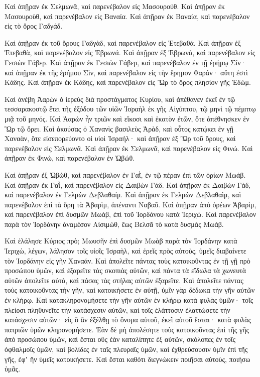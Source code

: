{Καὶ ἀπῇραν ἐκ Σελμωνᾶ, καὶ παρενέβαλον εἰς Μασουρούθ.
Καὶ ἀπῇραν ἐκ Μασουροὺθ, καὶ παρενέβαλον εἰς Βαναία.
Καὶ ἀπῇραν ἐκ Βαναία, καὶ παρενέβαλον εἰς τὸ ὄρος Γαδγάδ.
\par }{\PP {}Καὶ ἀπῇραν ἐκ τοῦ ὄρους Γαδγὰδ, καὶ παρενέβαλον εἰς Ἐτεβαθά.
Καὶ ἀπῇραν ἐξ Ἐτεβαθὰ, καὶ παρενέβαλον εἰς Ἐβρωνά.
Καὶ ἀπῇραν ἐξ Ἐβρωνὰ, καὶ παρενέβαλον εἰς Γεσιὼν Γάβερ.
Καὶ ἀπῇραν ἐκ Γεσιὼν Γάβερ, καὶ παρενέβαλον ἐν τῇ ἐρήμῳ Σίν· καὶ ἀπῇραν ἐκ τῆς ἐρήμου Σὶν, καὶ παρενέβαλον εἰς τὴν ἔρημον Φαράν· αὕτη ἐστὶ Κάδης.
Καὶ ἀπῇραν ἐκ Κάδης, καὶ παρενέβαλον εἰς Ὢρ τὸ ὄρος πλησίον γῆς Ἐδώμ.
\par }{\PP {}Καὶ ἀνέβη Ἀαρὼν ὁ ἱερεὺς διὰ προστάγματος Κυρίου, καὶ ἀπέθανεν ἐκεῖ ἐν τῷ τεσσαρακοστῷ ἔτει τῆς ἐξόδου τῶν υἱῶν Ἰσραὴλ ἐκ γῆς Αἰγύπτου, τῷ μηνὶ τῷ πέμπτῳ μιᾷ τοῦ μηνός.
Καὶ Ἀαρὼν ἦν τριῶν καὶ εἴκοσι καὶ ἑκατὸν ἐτῶν, ὅτε ἀπέθνησκεν ἐν Ὢρ τῷ ὄρει.
Καὶ ἀκούσας ὁ Χανανὶς βασιλεὺς Ἀρὰδ, καὶ οὗτος κατῴκει ἐν γῇ Χαναὰν, ὅτε εἰσεπορεύοντο οἱ υἱοὶ Ἰσραήλ·
καὶ ἀπῇραν ἐξ Ὢρ τοῦ ὄρους, καὶ παρενέβαλον εἰς Σελμωνᾶ.
Καὶ ἀπῇραν ἐκ Σελμωνᾶ, καὶ παρενέβαλον εἰς Φινώ.
Καὶ ἀπῇραν ἐκ Φινὼ, καὶ παρενέβαλον ἐν Ὠβώθ.
\par }{\PP {}Καὶ ἀπῇραν ἐξ Ὠβὼθ, καὶ παρενέβαλον ἐν Γαῒ, ἐν τῷ πέραν ἐπὶ τῶν ὁρίων Μωάβ.
Καὶ ἀπῇραν ἐκ Γαῒ, καὶ παρενέβαλον εἰς Δαιβὼν Γάδ.
Καὶ ἀπῇραν ἐκ Δαιβὼν Γὰδ, καὶ παρενέβαλον ἐν Γελμὼν Δεβλαθαίμ.
Καὶ ἀπῇραν ἐκ Γελμὼν Δεβλαθαὶμ, καὶ παρενέβαλον ἐπὶ τὰ ὄρη τὰ Ἀβαρὶμ, ἀπέναντι Ναβαῦ.
Καὶ ἀπῇραν ἀπὸ ὀρέων Ἀβαρὶμ, καὶ παρενέβαλον ἐπὶ δυσμῶν Μωὰβ, ἐπὶ τοῦ Ἰορδάνου κατὰ Ἱεριχώ.
Καὶ παρενέβαλον παρὰ τὸν Ἰορδάνην ἀναμέσον Αἰσιμώθ, ἕως Βελσᾶ τὸ κατὰ δυσμὰς Μωάβ.
\par }{\PP {}Καὶ ἐλάλησε Κύριος πρὸ; Μωυσῆν ἐπὶ δυσμῶν Μωὰβ παρὰ τὸν Ἰορδάνην κατὰ Ἱεριχὼ, λέγων,
λάλησον τοῖς υἱοῖς Ἰσραὴλ, καὶ ἐρεῖς πρὸς αὐτοὺς, ὑμεῖς διαβαίνετε τὸν Ἰορδάνην εἰς γῆν Χαναάν.
Καὶ ἀπολεῖτε πάντας τοὺς κατοικοῦντας ἐν τῇ γῇ πρὸ προσώπου ὑμῶν, καὶ ἐξαρεῖτε τὰς σκοπιὰς αὐτῶν, καὶ πάντα τὰ εἴδωλα τὰ χωνευτὰ αὐτῶν ἀπολεῖτε αὐτὰ, καὶ πάσας τὰς στήλας αὐτῶν ἐξαρεῖτε.
Καὶ ἀπολεῖτε πάντας τοὺς κατοικοῦντας τὴν γῆν, καὶ κατοικήσετε ἐν αὐτῇ, ὑμῖν γὰρ δέδωκα τὴν γῆν αὐτῶν ἐν κλήρῳ.
Καὶ κατακληρονομήσετε τὴν γῆν αὐτῶν ἐν κλήρῳ κατὰ φυλὰς ὑμῶν· τοῖς πλείοσι πληθυνεῖτε τὴν κατάσχεσιν αὐτῶν, καὶ τοῖς ἐλάττοσιν ἐλαττώσετε τὴν κατάσχεσιν αὐτῶν· εἰς ὃ ἂν ἐξέλθῃ τὸ ὄνομα αὐτοῦ, ἐκεῖ αὐτοῦ ἔσται· κατὰ φυλὰς πατριῶν ὑμῶν κληρονομήσετε.
Ἐὰν δὲ μὴ ἀπολέσητε τοὺς κατοικοῦντας ἐπὶ τῆς γῆς ἀπὸ προσώπου ὑμῶν, καὶ ἔσται οὓς ἐὰν καταλίπητε ἐξ αὐτῶν, σκόλοπες ἐν τοῖς ὀφθαλμοῖς ὑμῶν, καὶ βολίδες ἐν ταῖς πλευραῖς ὑμῶν, καὶ ἐχθρεύσουσιν ὑμῖν ἐπὶ τῆς γῆς, ἐφʼ ἣν ὑμεῖς κατοικήσετε.
Καὶ ἔσται καθότι διεγνώκειν ποιῆσαι αὐτοὺς, ποιήσω ὑμᾶς.

}
